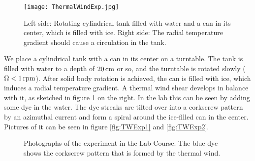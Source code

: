 \documentclass[12pt, a4paper]{article} %
\newcommand{\todoRef}{\todo[color=green!20]}
\begin{document}
		\begin{figure}[h]
			\centering
			\texttt{[image: ThermalWindExp.jpg]}
			\caption{Left side: Rotating cylindrical tank filled with water and a can in its center, which is filled with ice. Right side: The radial temperature gradient should cause a circulation in the tank. \cite{Marshall1965}}
			\label{fig:TWExperiment}
		\end{figure}
		
		We place a cylindrical tank with a can in its center on a turntable. The tank is filled with water to a depth of $\unit[20]{cm}$ or so, and the turntable is rotated slowly ($\Omega < \unit[1]{rpm}$). After solid body rotation is achieved, the can is filled with ice, which induces a radial temperature gradient. A thermal wind shear develops in balance with it, as sketched in figure \ref{fig:TWExperiment} on the right.
		\newline
		In the lab this can be seen by adding some dye in the water. The dye streaks are tilted over into a corkscrew pattern by an azimuthal current and form a spiral around the ice-filled can in the center. Pictures of it can be seen in figure \ref{fig:TWExp1} and \ref{fig:TWExp2}.
		
		
		\begin{figure}
				\centering
			\caption{Photographs of the experiment in the Lab Course. The blue dye shows the corkscrew pattern that is formed by the thermal wind.}
		\end{figure}
		
\end{document}
